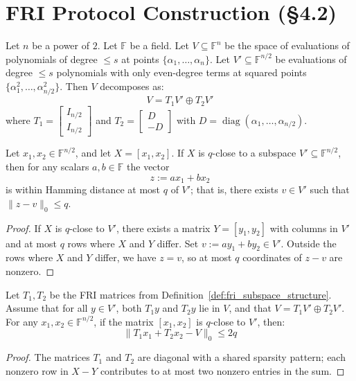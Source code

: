 \section*{FRI Protocol Construction (§4.2)}

\begin{definition}\label{def:fri_subspace_structure} \leanok
Let $n$ be a power of $2$. Let $\mathbb{F}$ be a field.
Let $V \subseteq \mathbb{F}^n$ be the space of evaluations of polynomials of degree $\leq s$ at points $\{\alpha_1,\ldots,\alpha_n\}$.
Let $V' \subseteq \mathbb{F}^{n/2}$ be evaluations of degree $\leq s$ polynomials with only even-degree terms at squared points $\{\alpha_1^2,\ldots,\alpha_{n/2}^2\}$.
Then $V$ decomposes as:
\[ V = T_1 V' \oplus T_2 V' \]
where $T_1 = \begin{bmatrix} I_{n/2} \\ I_{n/2} \end{bmatrix}$ and $T_2 = \begin{bmatrix} D \\ -D \end{bmatrix}$ with $D = \operatorname{diag}(\alpha_1,\ldots,\alpha_{n/2})$.
\end{definition}

\begin{lemma}\label{lem:basis_alignment_diagonal} \leanok {}
Let $x_1, x_2 \in \mathbb{F}^{n/2}$, and let $X = [x_1, x_2]$.
If $X$ is $q$-close to a subspace $V' \subseteq \mathbb{F}^{n/2}$, then for any scalars $a,b \in \mathbb{F}$ the vector
\[
z := a x_1 + b x_2
\]
is within Hamming distance at most $q$ of $V'$; that is, there exists $v \in V'$ such that $\|z-v\|_0 \le q$.
\end{lemma}
\begin{proof} \leanok
If $X$ is $q$-close to $V'$, there exists a matrix $Y = [y_1,y_2]$ with columns in $V'$ and at most $q$ rows where $X$ and $Y$ differ.
Set $v := a y_1 + b y_2 \in V'$.
Outside the rows where $X$ and $Y$ differ, we have $z = v$, so at most $q$ coordinates of $z-v$ are nonzero.
\end{proof}

\begin{lemma}\label{lem:fri_basis_alignment}\leanok {}
Let $T_1, T_2$ be the FRI matrices from Definition~\ref{def:fri_subspace_structure}.
Assume that for all $y \in V'$, both $T_1 y$ and $T_2 y$ lie in $V$, and that $V = T_1 V' \oplus T_2 V'$.
For any $x_1, x_2 \in \mathbb{F}^{n/2}$, if the matrix $[x_1, x_2]$ is $q$-close to $V'$, then:
\[ \|T_1 x_1 + T_2 x_2 - V\|_0 \leq 2q \]
\end{lemma}
\begin{proof} \leanok
The matrices $T_1$ and $T_2$ are diagonal with a shared sparsity pattern; each nonzero row in $X-Y$ contributes to at most two nonzero entries in the sum.
\end{proof}


